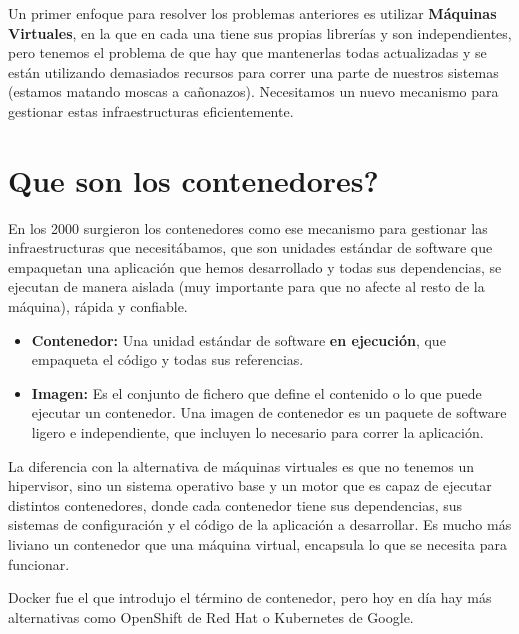 \documentclass[12pt, twoside, openright]{report} %
\begin{document}
Un primer enfoque para resolver los problemas anteriores es utilizar \textbf{Máquinas Virtuales}, en la que en cada una tiene sus propias librerías y son independientes, pero tenemos el problema de que hay que mantenerlas todas actualizadas y se están utilizando demasiados recursos para correr una parte de nuestros sistemas (estamos matando moscas a cañonazos).
Necesitamos un nuevo mecanismo para gestionar estas infraestructuras eficientemente.

\section{Que son los contenedores?}
En los 2000 surgieron los contenedores como ese mecanismo para gestionar las infraestructuras que necesitábamos, que son unidades estándar de software que empaquetan una aplicación que hemos desarrollado y todas sus dependencias, se ejecutan de manera aislada (muy importante para que no afecte al resto de la máquina), rápida y confiable.

\begin{itemize}
	\item \textbf{Contenedor:} Una unidad estándar de software \textbf{en ejecución}, que empaqueta el código y todas sus referencias.
	\item \textbf{Imagen:} Es el conjunto de fichero que define el contenido o lo que puede ejecutar un contenedor.
	      Una imagen de contenedor es un paquete de software ligero e independiente, que incluyen lo necesario para correr la aplicación.
\end{itemize}
\pagebreak

La diferencia con la alternativa de máquinas virtuales es que no tenemos un hipervisor, sino un sistema operativo base y un motor que es capaz de ejecutar distintos contenedores, donde cada contenedor tiene sus dependencias, sus sistemas de configuración y el código de la aplicación a desarrollar. Es mucho más liviano un contenedor que una máquina virtual, encapsula lo que se necesita para funcionar.

Docker fue el que introdujo el término de contenedor, pero hoy en día hay más alternativas como OpenShift de Red Hat o Kubernetes de Google.
\end{document}
